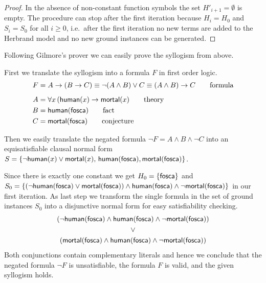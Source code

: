 \begin{proof}
	In the absence of non-constant function symbols the set \( H'_{i+1} = \emptyset \) is empty.
	The procedure can stop after the first iteration because
	\( H_i = H_0 \) and \( S_i = S_0 \) for all \( i\geq0 \),
	i.e.~after the first iteration
	no new terms are added to the Herbrand model
	and no new ground instances can be generated.
\end{proof}

Following Gilmore's prover we can easily prove the syllogism from above.

\begin{example}\label{ex:fosca:is:mortal}
	First we translate the syllogism into a formula \( F \) in first order logic.
	\begin{align*}
	F &= A \rightarrow (B \rightarrow C) \equiv \lnot(A\land B) \lor C \equiv (A\land B)\rightarrow C
	\tag*{formula}
	\\[0.5em]
	A &= \forall x \, ( \mathsf{human}(x) \rightarrow \mathsf{mortal}(x)
	\tag*{theory}
	\\
	B &= \mathsf{human}(\mathsf{fosca})
	\tag*{fact}
	\\
	C &= \mathsf{mortal}(\mathsf{fosca})
	\tag*{conjecture}
	\end{align*}



	Then we easily translate the negated formula \( \lnot F = A\land B \land\lnot C \) 
	into an equisatisfiable clausal normal form 
	\( S = \{
		\lnot \mathsf{human}(x) \lor \mathsf{mortal}(x),\,
		\mathsf{human}(\mathsf{fosca}), \mathsf{mortal}(\mathsf{fosca})
	\} \).
	
	Since there is exactly one constant we get
	\( H_0 = \{ \mathsf{fosca} \} \) and
	\( S_0 =
	 \{
	(\lnot\mathsf{human}(\mathsf{fosca})\lor\mathsf{mortal}(\mathsf{fosca}))\land\mathsf{human}(\mathsf{fosca})\land\lnot\mathsf{mortal}(\mathsf{fosca})
	\} \) in our first iteration.
	As last step we transform the single formula in
	the set of ground instances \( S_0 \) into a disjunctive normal form
	for easy satisfiability checking.
	\begin{gather*}
	(\lnot\mathsf{human}(\mathsf{fosca})\land\mathsf{human}(\mathsf{fosca})\land\lnot\mathsf{mortal}(\mathsf{fosca}))
	\\
	\lor
	\\
	(\mathsf{mortal}(\mathsf{fosca})\land\mathsf{human}(\mathsf{fosca})\land\lnot\mathsf{mortal}(\mathsf{fosca}))
	\end{gather*}
	Both conjunctions contain complementary literals and hence we conclude 
	that the negated formula \( \lnot F \) is unsatisfiable, 
	the formula \( F \) is valid,
	and the given syllogism holds.
\end{example}

